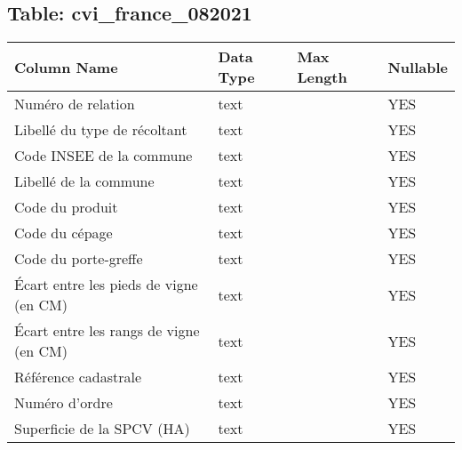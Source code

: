 \subsection*{Table: cvi_france_082021}
\begin{tabular}{llll}
\hline
 Column Name                            & Data Type   & Max Length   & Nullable   \\
\hline
 Numéro de relation                     & text        &              & YES        \\
 Libellé du type de récoltant           & text        &              & YES        \\
 Code INSEE de la commune               & text        &              & YES        \\
 Libellé de la commune                  & text        &              & YES        \\
 Code du produit                        & text        &              & YES        \\
 Code du cépage                         & text        &              & YES        \\
 Code du porte-greffe                   & text        &              & YES        \\
 Écart entre les pieds de vigne (en CM) & text        &              & YES        \\
 Écart entre les rangs de vigne (en CM) & text        &              & YES        \\
 Référence cadastrale                   & text        &              & YES        \\
 Numéro d'ordre                         & text        &              & YES        \\
 Superficie de la SPCV (HA)             & text        &              & YES        \\
\hline
\end{tabular}
